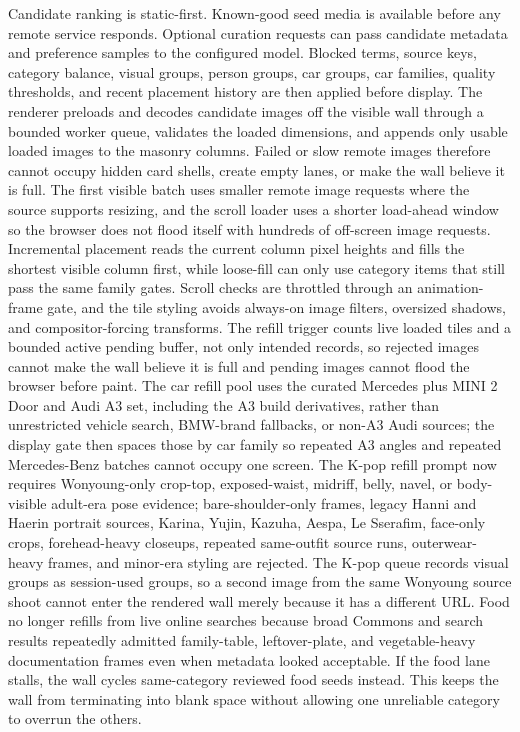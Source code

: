 \documentclass[12pt,letterpaper]{article}
\begin{document}
Candidate ranking is static-first. Known-good seed media is available before any remote service responds. Optional curation requests can pass candidate metadata and preference samples to the configured model. Blocked terms, source keys, category balance, visual groups, person groups, car groups, car families, quality thresholds, and recent placement history are then applied before display. The renderer preloads and decodes candidate images off the visible wall through a bounded worker queue, validates the loaded dimensions, and appends only usable loaded images to the masonry columns. Failed or slow remote images therefore cannot occupy hidden card shells, create empty lanes, or make the wall believe it is full. The first visible batch uses smaller remote image requests where the source supports resizing, and the scroll loader uses a shorter load-ahead window so the browser does not flood itself with hundreds of off-screen image requests. Incremental placement reads the current column pixel heights and fills the shortest visible column first, while loose-fill can only use category items that still pass the same family gates. Scroll checks are throttled through an animation-frame gate, and the tile styling avoids always-on image filters, oversized shadows, and compositor-forcing transforms. The refill trigger counts live loaded tiles and a bounded active pending buffer, not only intended records, so rejected images cannot make the wall believe it is full and pending images cannot flood the browser before paint. The car refill pool uses the curated Mercedes plus MINI 2 Door and Audi A3 set, including the A3 build derivatives, rather than unrestricted vehicle search, BMW-brand fallbacks, or non-A3 Audi sources; the display gate then spaces those by car family so repeated A3 angles and repeated Mercedes-Benz batches cannot occupy one screen. The K-pop refill prompt now requires Wonyoung-only crop-top, exposed-waist, midriff, belly, navel, or body-visible adult-era pose evidence; bare-shoulder-only frames, legacy Hanni and Haerin portrait sources, Karina, Yujin, Kazuha, Aespa, Le Sserafim, face-only crops, forehead-heavy closeups, repeated same-outfit source runs, outerwear-heavy frames, and minor-era styling are rejected. The K-pop queue records visual groups as session-used groups, so a second image from the same Wonyoung source shoot cannot enter the rendered wall merely because it has a different URL. Food no longer refills from live online searches because broad Commons and search results repeatedly admitted family-table, leftover-plate, and vegetable-heavy documentation frames even when metadata looked acceptable. If the food lane stalls, the wall cycles same-category reviewed food seeds instead. This keeps the wall from terminating into blank space without allowing one unreliable category to overrun the others.
\end{document}
